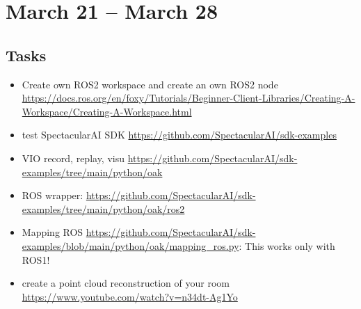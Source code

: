\documentclass{article}
\begin{document}
\newpage



\section{March 21 -- March 28}
\subsection{Tasks}
\begin{itemize}
\item Create own ROS2 workspace and create an own ROS2 node \url{https://docs.ros.org/en/foxy/Tutorials/Beginner-Client-Libraries/Creating-A-Workspace/Creating-A-Workspace.html} 
\item test SpectacularAI SDK \url{https://github.com/SpectacularAI/sdk-examples} 
\item VIO record, replay, visu \url{https://github.com/SpectacularAI/sdk-examples/tree/main/python/oak} 
\item ROS wrapper: \url{https://github.com/SpectacularAI/sdk-examples/tree/main/python/oak/ros2} 
\item Mapping ROS \url{https://github.com/SpectacularAI/sdk-examples/blob/main/python/oak/mapping_ros.py}: This works only with ROS1!
\item create a point cloud reconstruction of your room
\url{https://www.youtube.com/watch?v=n34dt-Ag1Yo} 
\end{itemize}
\end{document}
